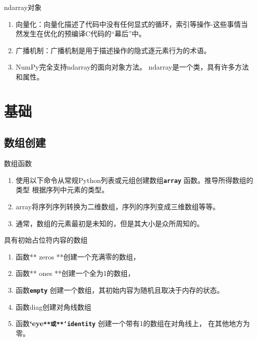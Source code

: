 \documentclass[ignorenonframetext,11pt,xcolor=dvipsnames,hyperref={colorlinks,allcolors=.,urlcolor=blue, citecolor=violet, bookmarksdepth=4},aspectratio=1610]{beamer}
\providecommand{\tightlist}{%
  \setlength{\itemsep}{0pt}\setlength{\parskip}{0pt}}
\newcommand{\passthrough}[1]{#1}
\begin{document}
\begin{frame}{ndarray对象}
\protect\hypertarget{ndarray}{}

\begin{enumerate}
\tightlist
\item
  向量化：向量化描述了代码中没有任何显式的循环，索引等操作-这些事情当然发生在优化的预编译C代码的``幕后''中。
\item
  广播机制：广播机制是用于描述操作的隐式逐元素行为的术语。
\item
  NumPy完全支持ndarray的面向对象方法。
  ndarray是一个类，具有许多方法和属性。
\end{enumerate}

\end{frame}

\hypertarget{section-2}{%
\section{基础}\label{section-2}}

\hypertarget{section-3}{%
\subsection{数组创建}\label{section-3}}

\begin{frame}[fragile]{数组函数}
\protect\hypertarget{section-4}{}

\begin{enumerate}
\tightlist
\item
  使用以下命令从常规Python列表或元组创建数组\textbf{\passthrough{\lstinline!array!}
  }函数。推导所得数组的类型 根据序列中元素的类型。
\item
  array将序列序列转换为二维数组，序列的序列变成三维数组等等。
\item
  通常，数组的元素最初是未知的，但是其大小是众所周知的。
\end{enumerate}

\end{frame}

\begin{frame}[fragile]{具有初始占位符内容的数组}
\protect\hypertarget{section-5}{}

\begin{enumerate}
\tightlist
\item
  函数** zeros **创建一个充满零的数组，
\item
  函数** ones **创建一个全为1的数组，
\item
  函数\textbf{\passthrough{\lstinline!empty!}
  }创建一个数组，其初始内容为随机且取决于内存的状态。
\item
  函数diag创建对角线数组
\item
  函数\textbf{ʻeye\passthrough{\lstinline!**或**ʻidentity!}
  }创建一个带有1的数组在对角线上， 在其他地方为零。
\end{enumerate}

\end{frame}
\end{document}

